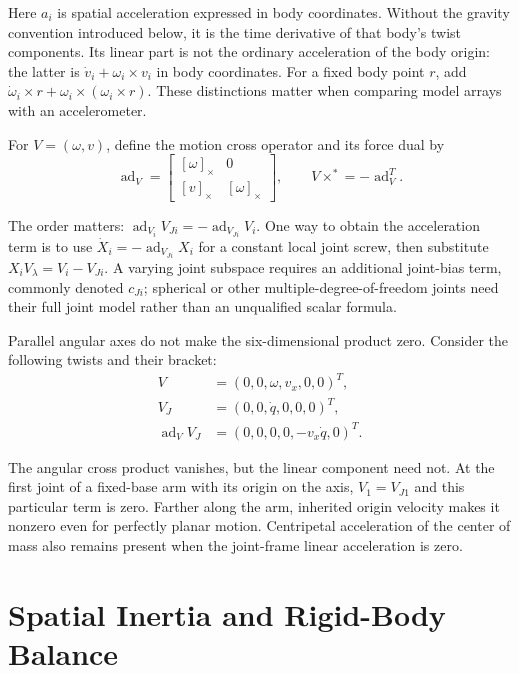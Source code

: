 Here $a_i$ is spatial acceleration expressed in body coordinates. Without the gravity convention introduced below, it is the time derivative of that body's twist components. Its linear part is not the ordinary acceleration of the body origin: the latter is $\dot v_i+\omega_i\times v_i$ in body coordinates. For a fixed body point $r$, add $\dot\omega_i\times r+\omega_i\times(\omega_i\times r)$. These distinctions matter when comparing model arrays with an accelerometer.

For $V=(\omega,v)$, define the motion cross operator and its force dual by
\begin{equation}
 \operatorname{ad}_{V}=
 \begin{bmatrix}[\omega]_\times&0\\{}[v]_\times&[\omega]_\times\end{bmatrix},
 \qquad V\times^*=-\operatorname{ad}_{V}^T.
 \label{eq:motion_cross}
\end{equation}

The order matters: $\operatorname{ad}_{V_i}V_{Ji}=-\operatorname{ad}_{V_{Ji}}V_i$. One way to obtain the acceleration term is to use $\dot X_i=-\operatorname{ad}_{V_{Ji}}X_i$ for a constant local joint screw, then substitute $X_iV_\lambda=V_i-V_{Ji}$. A varying joint subspace requires an additional joint-bias term, commonly denoted $c_{Ji}$; spherical or other multiple-degree-of-freedom joints need their full joint model rather than an unqualified scalar formula.

Parallel angular axes do not make the six-dimensional product zero. Consider the following twists and their bracket:
\begin{equation}
 \begin{aligned}
 V&=(0,0,\omega,v_x,0,0)^T,\\
 V_J&=(0,0,\dot q,0,0,0)^T,\\
 \operatorname{ad}_{V}V_J&=(0,0,0,0,-v_x\dot q,0)^T.
 \end{aligned}
 \label{eq:planar_spatial_bias}
\end{equation}

The angular cross product vanishes, but the linear component need not. At the first joint of a fixed-base arm with its origin on the axis, $V_1=V_{J1}$ and this particular term is zero. Farther along the arm, inherited origin velocity makes it nonzero even for perfectly planar motion. Centripetal acceleration of the center of mass also remains present when the joint-frame linear acceleration is zero.

\section{Spatial Inertia and Rigid-Body Balance}
\label{sec:spatial_inertia_intro}

